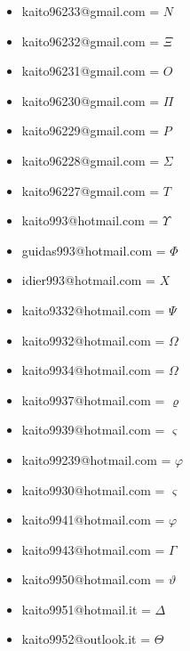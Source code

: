 \documentclass[12pt, a4paper] {article} %
\begin{document}
\begin{itemize}
		\item kaito96233@gmail.com =  $N$ \\
		\item kaito96232@gmail.com =  $\Xi$ \\
		\item kaito96231@gmail.com =  $O$ \\
		\item kaito96230@gmail.com =  $\Pi$ \\
		\item kaito96229@gmail.com =  $P$ \\
		\item kaito96228@gmail.com =  $\Sigma$ \\
		\item kaito96227@gmail.com =  $T$ \\
		\item kaito993@hotmail.com =  $\Upsilon$ \\
		\item guidas993@hotmail.com = $\Phi$ \\
		\item idier993@hotmail.com = $X$ \\
		\item kaito9332@hotmail.com = $\Psi$ \\
		\item kaito9932@hotmail.com = $\Omega$ \\
		\item kaito9934@hotmail.com = $\varOmega$ \\
		\item kaito9937@hotmail.com = $\varrho$ \\
		\item kaito9939@hotmail.com = $\varsigma$ \\
		\item kaito99239@hotmail.com = $\varphi$ \\
		\item kaito9930@hotmail.com = $\varsigma$ \\
		\item kaito9941@hotmail.com = $\varphi$ \\
		\item kaito9943@hotmail.com = $\varGamma$ \\
		\item kaito9950@hotmail.com = $\vartheta$ \\
		\item kaito9951@hotmail.it = $\varDelta$ \\
		\item kaito9952@outlook.it = $\varTheta$ \\

\end{itemize}
\end{document}
